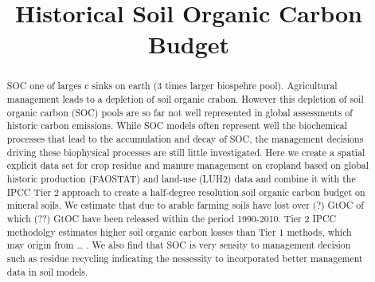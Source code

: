 \documentclass[gc, manuscript]{copernicus}
\begin{document}
\title{Historical Soil Organic Carbon Budget}














\received{}
\pubdiscuss{} %
\revised{}
\accepted{}
\published{}




\maketitle


\begin{abstract}
SOC one of larges c sinks on earth (3 times larger biospehre pool). Agricultural management leads to a depletion of soil organic crabon. However
this depletion of soil organic carbon (SOC) pools are so far not well represented in global assessments of historic carbon emissions. While SOC
models often represent well the biochemical processes that lead to the accumulation and decay of SOC, the management decisions driving these
biophysical processes are still little investigated.
Here we create a spatial explicit data set for crop residue and manure management on cropland based on global historic production (FAOSTAT) and
land-use (LUH2) data and combine it with the IPCC Tier 2 approach to create a half-degree resolution soil organic carbon budget on mineral soils.
We estimate that due to arable farming soils have lost over (?) GtOC of which (??) GtOC have been released within the period 1990-2010.
Tier 2 IPCC methodolgy estimates higher soil organic carbon losses than Tier 1 methods, which may origin from \ldots{} . We also find that SOC is very
sensity to management decision such as residue recycling indicating the nessessity to incorporated better management data in soil models.
\end{abstract}
\end{document}
